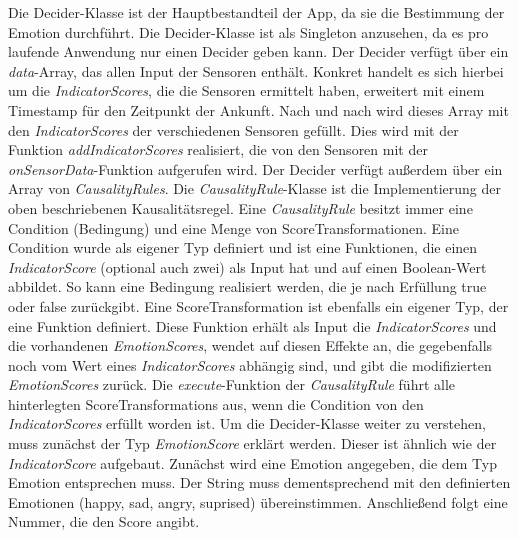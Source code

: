Die Decider-Klasse ist der Hauptbestandteil der App, da sie die Bestimmung der Emotion durchführt. Die Decider-Klasse ist als Singleton anzusehen, da es pro laufende Anwendung nur einen Decider geben kann. Der Decider verfügt über ein \textit{data}-Array, das allen Input der Sensoren enthält. Konkret handelt es sich hierbei um die \textit{IndicatorScores}, die die Sensoren ermittelt haben, erweitert mit einem Timestamp für den Zeitpunkt der Ankunft. Nach und nach wird dieses Array mit den \textit{IndicatorScores} der verschiedenen Sensoren gefüllt. Dies wird mit der Funktion \textit{addIndicatorScores} realisiert, die von den Sensoren mit der \textit{onSensorData}-Funktion aufgerufen wird. \newline
Der Decider verfügt außerdem über ein Array von \textit{CausalityRules}. Die \textit{CausalityRule}-Klasse ist die Implementierung der oben beschriebenen Kausalitätsregel. Eine \textit{CausalityRule} besitzt immer eine Condition (Bedingung) und eine Menge von ScoreTransformationen. \newline
Eine Condition wurde als eigener Typ definiert und ist eine Funktionen, die einen \textit{IndicatorScore} (optional auch zwei) als Input hat und auf einen Boolean-Wert abbildet. So kann eine Bedingung realisiert werden, die je nach Erfüllung true oder false zurückgibt. Eine ScoreTransformation ist ebenfalls ein eigener Typ, der eine Funktion definiert. Diese Funktion erhält als Input die \textit{IndicatorScores} und die vorhandenen \textit{EmotionScores}, wendet auf diesen Effekte an, die gegebenfalls noch vom Wert eines \textit{IndicatorScores} abhängig sind, und gibt die modifizierten \textit{EmotionScores} zurück. \newline
Die \textit{execute}-Funktion der \textit{CausalityRule} führt alle hinterlegten ScoreTransformations aus, wenn die Condition von den \textit{IndicatorScores} erfüllt worden ist. \newline
Um die Decider-Klasse weiter zu verstehen, muss zunächst der Typ \textit{EmotionScore} erklärt werden. Dieser ist ähnlich wie der \textit{IndicatorScore} aufgebaut. Zunächst wird eine Emotion angegeben, die dem Typ Emotion entsprechen muss. Der String muss dementsprechend mit den definierten Emotionen (happy, sad, angry, suprised) übereinstimmen. Anschließend folgt eine Nummer, die den Score angibt.\newline \newline
